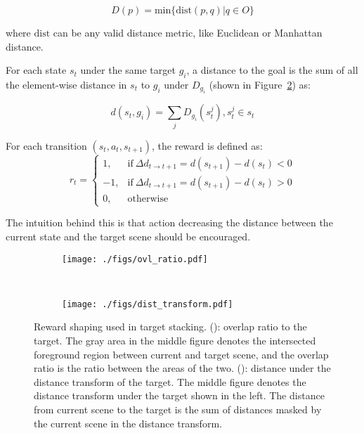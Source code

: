 \begin{equation}
D(p) = \text{min}\{\text{dist}(p,q)|q\in O\}
\end{equation}

where $\text{dist}$ can be any valid distance metric, like Euclidean or Manhattan distance. 

For each state $s_t$ under the same target $g_i$, a distance to the goal is the sum of all the element-wise distance in $s_t$ to $g_i$ under $D_{g_i}$ (shown in Figure~\ref{fig:dist_transform}) as: 

\begin{equation}
d(s_t,g_i) = \sum_j D_{g_i}(s_t^j), s_t^j \in s_t
\end{equation}

For each transition $(s_t, a_t, s_{t+1})$, the reward is defined as: 
\begin{equation}
    r_t =
    \begin{cases}
      1, & \text{if}\ \Delta d_{t\rightarrow t+1} = d(s_{t+1}) - d(s_t) <  0 \\
      -1, & \text{if}\ \Delta d_{t\rightarrow t+1} = d(s_{t+1}) - d(s_t) >  0\\
      0, & \text{otherwise}
    \end{cases}
\end{equation}

The intuition behind this is that action decreasing the distance between the current state and the target scene should be encouraged.

\begin{figure}
\centering
\begin{subfigure}{0.47\linewidth}
\texttt{[image: ./figs/ovl\_ratio.pdf]}
\caption{}
\label{fig:overlap_ratio}
\end{subfigure}
~
\begin{subfigure}{0.47\linewidth}
\texttt{[image: ./figs/dist\_transform.pdf]}
\caption{}
\label{fig:dist_transform}
\end{subfigure}
\caption{Reward shaping used in target stacking. (\protect{}): overlap ratio to the target. The gray area in the middle figure denotes the intersected foreground region between current and target scene, and the overlap ratio is the ratio between the areas of the two. (\protect{}): distance under the distance transform of the target. The middle figure denotes the distance transform under the target shown in the left. The distance from current scene to the target is the sum of distances masked by the current scene in the distance transform.}
\label{fig:reward_shape}
\end{figure}